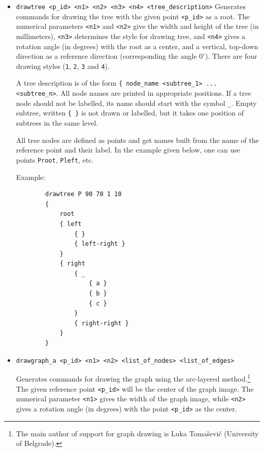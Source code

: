 \documentclass[a4paper]{book}
\begin{document}
\begin{itemize}
\item \verb|drawtree <p_id> <n1> <n2> <n3> <n4> <tree_description>|
        Genera\-tes commands for drawing the tree with the given point
        \verb|<p_id>| as a root. The numerical parameters \verb|<n1>|
        and \verb|<n2>| give the width and height of the tree (in millimeters),
        \verb|<n3>| determines the style for drawing tree, and \verb|<n4>|
        gives a rotation angle (in degrees) with the root as a center, and
        a vertical, top-down direction as a reference direction
        (corresponding the angle $0^\circ$). There are four drawing
        styles (\verb|1|, \verb|2|, \verb|3| and \verb|4|).

        A tree description is of the form \verb|{ node_name <subtree_1> ...| \verb|<subtree_n>|.
        All node names are printed in appropriate positions.
        If a tree node should not be labelled, its name should start with
        the symbol \verb|_|. Empty subtree, written \verb|{ }| is not drawn
        or labelled, but it takes one position of subtrees in the same level.

        All tree nodes are defined as {\sc point}s and get names built from
        the name of the reference point and their label. In the example
        given below, one can use points \verb|Proot|, \verb|Pleft|, etc.

        Example:

        \begin{verbatim}
        drawtree P 90 70 1 10
        {
            root
            { left
                { }
                { left-right }
            }
            { right
                { _
                    { a }
                    { b }
                    { c }
                }
                { right-right }
            }
        }
        \end{verbatim}

\item \verb|drawgraph_a <p_id> <n1> <n2> <list_of_nodes> <list_of_edges>|

        Generates commands for drawing the graph using the arc-layered
        method.\footnote{The main author of support for graph drawing is
        Luka Toma\v{s}evi\'c (University of Belgrade).} The given reference
        point \verb|<p_id>| will be the center of the graph image. The
        numerical parameter \verb|<n1>| gives the width of the graph image,
        while \verb|<n2>| gives a rotation angle (in degrees) with the
        point \verb|<p_id>| as the center.


\end{itemize}
\end{document}
